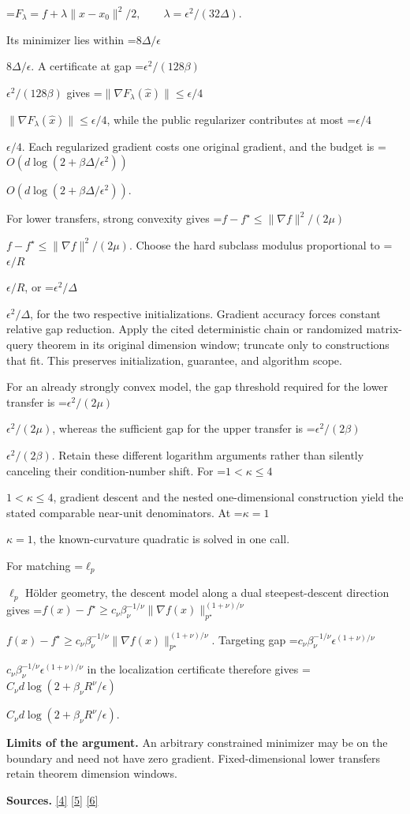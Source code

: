 \documentclass[10pt,a4paper]{article}
\newcommand{\AtlasMath}[1]{\par\begingroup\centering\setbox0=\hbox{$\displaystyle #1$}\ifdim\wd0>1.4\linewidth\typeout{ATLAS WIDE FORMULA: \the\wd0}\fi\ifdim\wd0>\linewidth\resizebox{\linewidth}{!}{\box0}\else\box0\fi\par\endgroup}
\newcommand{\AtlasInlineMath}[1]{\begingroup\setbox0=\hbox{$#1$}\ifdim\wd0>.4\linewidth\endgroup\AtlasMath{#1}\else\endgroup$#1$\fi}
\begin{document}
\AtlasMath{F_\lambda=f+\lambda\|x-x_0\|^2/2,\qquad\lambda=\epsilon^2/(32\Delta).}

Its minimizer lies within \AtlasInlineMath{8\Delta/\epsilon}. A certificate at gap \AtlasInlineMath{\epsilon^2/(128\beta)} gives \AtlasInlineMath{\|\nabla F_\lambda(\widehat x)\|\le\epsilon/4}, while the public regularizer contributes at most \AtlasInlineMath{\epsilon/4}. Each regularized gradient costs one original gradient, and the budget is \AtlasInlineMath{O(d\log(2+\beta\Delta/\epsilon^2))}.

For lower transfers, strong convexity gives \AtlasInlineMath{f-f^\star\le\|\nabla f\|^2/(2\mu)}. Choose the hard subclass modulus proportional to \AtlasInlineMath{\epsilon/R}, or \AtlasInlineMath{\epsilon^2/\Delta}, for the two respective initializations. Gradient accuracy forces constant relative gap reduction. Apply the cited deterministic chain or randomized matrix-query theorem in its original dimension window; truncate only to constructions that fit. This preserves initialization, guarantee, and algorithm scope.

For an already strongly convex model, the gap threshold required for the lower transfer is \AtlasInlineMath{\epsilon^2/(2\mu)}, whereas the sufficient gap for the upper transfer is \AtlasInlineMath{\epsilon^2/(2\beta)}. Retain these different logarithm arguments rather than silently canceling their condition-number shift. For \AtlasInlineMath{1<\kappa\le4}, gradient descent and the nested one-dimensional construction yield the stated comparable near-unit denominators. At \AtlasInlineMath{\kappa=1}, the known-curvature quadratic is solved in one call.

For matching \AtlasInlineMath{\ell_p} Hölder geometry, the descent model along a dual steepest-descent direction gives
\AtlasInlineMath{f(x)-f^\star\ge c_\nu\beta_\nu^{-1/\nu}\|\nabla f(x)\|_{p^\star}^{(1+\nu)/\nu}}.
Targeting gap \AtlasInlineMath{c_\nu\beta_\nu^{-1/\nu}\epsilon^{(1+\nu)/\nu}} in the localization certificate therefore gives
\AtlasInlineMath{C_\nu d\log(2+\beta_\nu R^\nu/\epsilon)}.

\textbf{Limits of the argument.} An arbitrary constrained minimizer may be on the boundary and need not have zero gradient. Fixed-dimensional lower transfers retain theorem dimension windows.

\textbf{Sources.} \href{https://arxiv.org/pdf/2101.09740v2}{[4]} \href{https://arxiv.org/pdf/2609.33360v2}{[5]} \href{https://arxiv.org/pdf/2609.10874}{[6]}
\end{document}
